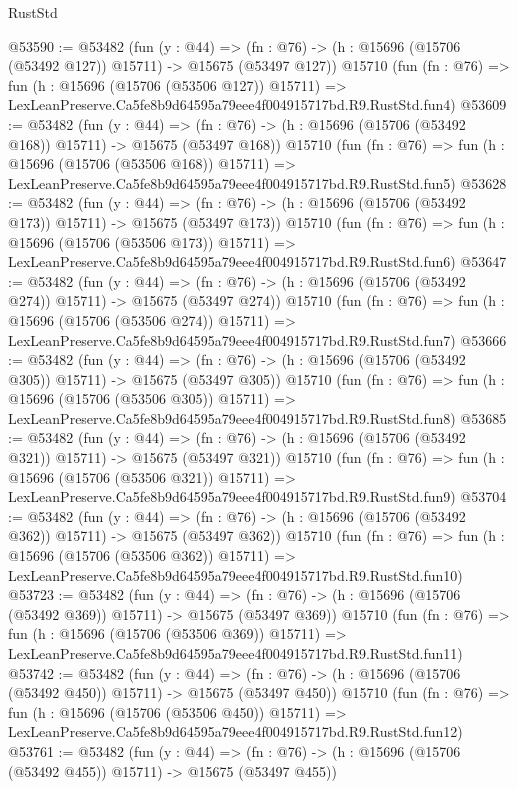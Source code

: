 \begin{lexlean}{RustStd}
\begin{coremodule}
@53590 := @53482
    (fun (y : @44) =>
    (fn : @76) -> (h : @15696 (@15706 (@53492 @127)) @15711) -> @15675 (@53497 @127))
    @15710
    (fun (fn : @76) =>
    fun (h : @15696 (@15706 (@53506 @127)) @15711) =>
    LexLeanPreserve.Ca5fe8b9d64595a79eee4f004915717bd.R9.RustStd.fun4)
@53609 := @53482
    (fun (y : @44) =>
    (fn : @76) -> (h : @15696 (@15706 (@53492 @168)) @15711) -> @15675 (@53497 @168))
    @15710
    (fun (fn : @76) =>
    fun (h : @15696 (@15706 (@53506 @168)) @15711) =>
    LexLeanPreserve.Ca5fe8b9d64595a79eee4f004915717bd.R9.RustStd.fun5)
@53628 := @53482
    (fun (y : @44) =>
    (fn : @76) -> (h : @15696 (@15706 (@53492 @173)) @15711) -> @15675 (@53497 @173))
    @15710
    (fun (fn : @76) =>
    fun (h : @15696 (@15706 (@53506 @173)) @15711) =>
    LexLeanPreserve.Ca5fe8b9d64595a79eee4f004915717bd.R9.RustStd.fun6)
@53647 := @53482
    (fun (y : @44) =>
    (fn : @76) -> (h : @15696 (@15706 (@53492 @274)) @15711) -> @15675 (@53497 @274))
    @15710
    (fun (fn : @76) =>
    fun (h : @15696 (@15706 (@53506 @274)) @15711) =>
    LexLeanPreserve.Ca5fe8b9d64595a79eee4f004915717bd.R9.RustStd.fun7)
@53666 := @53482
    (fun (y : @44) =>
    (fn : @76) -> (h : @15696 (@15706 (@53492 @305)) @15711) -> @15675 (@53497 @305))
    @15710
    (fun (fn : @76) =>
    fun (h : @15696 (@15706 (@53506 @305)) @15711) =>
    LexLeanPreserve.Ca5fe8b9d64595a79eee4f004915717bd.R9.RustStd.fun8)
@53685 := @53482
    (fun (y : @44) =>
    (fn : @76) -> (h : @15696 (@15706 (@53492 @321)) @15711) -> @15675 (@53497 @321))
    @15710
    (fun (fn : @76) =>
    fun (h : @15696 (@15706 (@53506 @321)) @15711) =>
    LexLeanPreserve.Ca5fe8b9d64595a79eee4f004915717bd.R9.RustStd.fun9)
@53704 := @53482
    (fun (y : @44) =>
    (fn : @76) -> (h : @15696 (@15706 (@53492 @362)) @15711) -> @15675 (@53497 @362))
    @15710
    (fun (fn : @76) =>
    fun (h : @15696 (@15706 (@53506 @362)) @15711) =>
    LexLeanPreserve.Ca5fe8b9d64595a79eee4f004915717bd.R9.RustStd.fun10)
@53723 := @53482
    (fun (y : @44) =>
    (fn : @76) -> (h : @15696 (@15706 (@53492 @369)) @15711) -> @15675 (@53497 @369))
    @15710
    (fun (fn : @76) =>
    fun (h : @15696 (@15706 (@53506 @369)) @15711) =>
    LexLeanPreserve.Ca5fe8b9d64595a79eee4f004915717bd.R9.RustStd.fun11)
@53742 := @53482
    (fun (y : @44) =>
    (fn : @76) -> (h : @15696 (@15706 (@53492 @450)) @15711) -> @15675 (@53497 @450))
    @15710
    (fun (fn : @76) =>
    fun (h : @15696 (@15706 (@53506 @450)) @15711) =>
    LexLeanPreserve.Ca5fe8b9d64595a79eee4f004915717bd.R9.RustStd.fun12)
@53761 := @53482
    (fun (y : @44) =>
    (fn : @76) -> (h : @15696 (@15706 (@53492 @455)) @15711) -> @15675 (@53497 @455))

\end{coremodule}
\end{lexlean}
